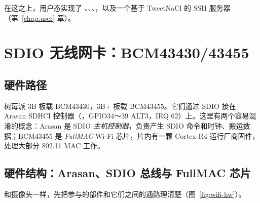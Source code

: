 在这之上，用户态实现了 、、、，以及一个基于 TweetNaCl 的 SSH 服务器（第~\ref{chap:user} 章）。

\section{SDIO 无线网卡：BCM43430/43455}

\subsection{硬件路径}

树莓派 3B 板载 BCM43430，3B+ 板载 BCM43455。它们通过 SDIO 接在 Arasan SDHCI 控制器（，GPIO34～39 ALT3，IRQ 62）上。这里有两个容易混淆的概念：Arasan 是 SDIO \emph{主机控制器}，负责产生 SDIO 命令和时钟、搬运数据；BCM43455 是 \emph{FullMAC} Wi-Fi 芯片，片内有一颗 Cortex-R4 运行厂商固件，处理大部分 802.11 MAC 工作。

\subsection{硬件结构：Arasan、SDIO 总线与 FullMAC 芯片}
\label{sec:wifi-hw}

和摄像头一样，先把参与的部件和它们之间的通路理清楚（图~\ref{fig:wifi-hw}）。


